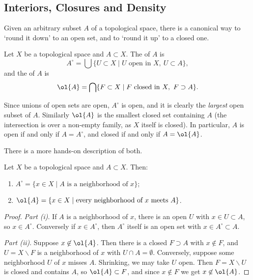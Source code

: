 \documentclass[a4paper]{scrartcl}
\begin{document}
\subsection{Interiors, Closures and Density}

Given an arbitrary subset $A$ of a topological space, there is a canonical way to `round it down' to an open set, and to `round it up' to a closed one.

\begin{definition}
    Let $X$ be a topological space and $A \subset X$. The  of $A$ is
    $$
    A^{\circ} = \bigcup \{U \subset X \mid U \text{ open in } X, \ U \subset A\},
    $$
    and the  of $A$ is
    $$
    \ol{A} = \bigcap \{F \subset X \mid F \text{ closed in } X, \ F \supset A\}.
    $$
\end{definition}

Since unions of open sets are open, $A^{\circ}$ is open, and it is clearly the \emph{largest} open subset of $A$. Similarly $\ol{A}$ is the smallest closed set containing $A$ (the intersection is over a non-empty family, as $X$ itself is closed). In particular, $A$ is open if and only if $A = A^{\circ}$, and closed if and only if $A = \ol{A}$.

There is a more hands-on description of both.

\begin{proposition}
    Let $X$ be a topological space and $A \subset X$. Then:
    \begin{enumerate}[label=(\roman*)]
        \item $A^{\circ} = \{x \in X \mid A \text{ is a neighborhood of } x\}$;
        \item $\ol{A} = \{x \in X \mid \text{every neighborhood of } x \text{ meets } A\}$.
    \end{enumerate}
\end{proposition}
\begin{proof}
    \emph{Part (i)}. If $A$ is a neighborhood of $x$, there is an open $U$ with $x \in U \subset A$, so $x \in A^{\circ}$. Conversely if $x \in A^{\circ}$, then $A^{\circ}$ itself is an open set with $x \in A^{\circ} \subset A$.

    \emph{Part (ii)}. Suppose $x \not \in \ol{A}$. Then there is a closed $F \supset A$ with $x \not \in F$, and $U = X \backslash F$ is a neighborhood of $x$ with $U \cap A = \emptyset$. Conversely, suppose some neighborhood $U$ of $x$ misses $A$. Shrinking, we may take $U$ open. Then $F = X \backslash U$ is closed and contains $A$, so $\ol{A} \subset F$, and since $x \not \in F$ we get $x \not \in \ol{A}$.
\end{proof}
\end{document}
